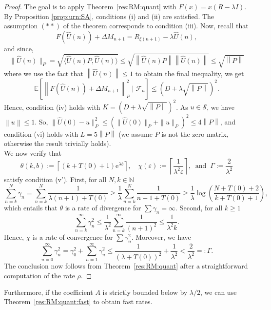 \documentclass[12pt]{amsart}
\theoremstyle{definition}
\theoremstyle{remark}
\newcommand{\norm}[1]{\left\lVert#1\right\rVert}
\newcommand{\NN}{\mathbb{N}}
\newcommand{\EE}{\mathbb{E}}
\newcommand{\eps}{\varepsilon}
\begin{document}
\begin{proof}
   The goal is to apply Theorem~\ref{res:RM:quant} with $F(x)= x(R-\lambda I)$. By Proposition \ref{prop:urn:SA}, conditions (i) and (ii) are satisfied. The assumption $(**)$ of the theorem corresponds to condition (iii).  Now, recall that
   \[
   F(\hat{U}(n))+\Delta M_{n+1}=R_{\xi(n+1)} - \lambda \hat{U}(n),
   \]
   and since,
   \[
   \|\hat{U}(n)\|_P = \sqrt{\langle \hat{U}(n)P, \hat{U}(n)\rangle} \le \sqrt{\norm{\hat{U}(n)P}\norm{\hat{U}(n)}} \le \sqrt{\norm{P}}
   \]
   where we use the fact that $\norm{\hat{U}(n)} \le 1$ to obtain the final inequality, we get
   \[
   \EE\left[ \left\| F(\hat{U}(n))+\Delta M_{n+1} \right\|_P^2 \mid \mathcal{F}_n \right] \leq (D+\lambda\sqrt{\norm{P}})^2.
   \]
   Hence, condition (iv) holds with $K=(D+\lambda\sqrt{\norm{P}})^2$. As $u\in \mathcal{S}$, we have $\norm{u}\le 1$. So, $\|\hat{U}(0)-u\|_P^2\leq \left(\|\hat{U}(0)\|_P+\|u\|_P\right)^2\leq 4 \norm{P}$, and condition (vi) holds with $L=5\norm{P}$ (we assume $P$ is not the zero matrix, otherwise the result trivially holds).\\
   
   We now verify that
   \[
   \theta(k,b):=\left\lceil(k+T(0)+1)\mathrm{e}^{\lambda b}\right\rceil, \quad \chi(\eps):=\left\lceil \frac{1}{\lambda^2\eps}\right\rceil,\ \text{ and }\ \Gamma:=\frac{2}{\lambda^2}
   \]
   satisfy condition (v'). First, for all $N,k\in\NN$
   \begin{equation*}
       \sum_{n=k}^N\gamma_n=\sum_{n=k}^N \frac{1}{\lambda(n+1)+T(0)}\geq \frac{1}{\lambda}\sum_{n=k}^N\frac{1}{n+1+T(0)}\geq \frac{1}{\lambda}\log\left(\frac{N+T(0)+2}{k+T(0)+1}\right),
   \end{equation*}
   which entails that $\theta$ is a rate of divergence for $\sum \gamma_n=\infty$. Second, for all $k\geq 1$
   \begin{equation*}
       \sum_{n=k}^\infty \gamma_n^2 \leq \frac{1}{\lambda^2}\sum_{n=k}^\infty \frac{1}{(n+1)^2}\leq \frac{1}{\lambda^2 k}.
   \end{equation*}
   Hence, $\chi$ is a rate of convergence for $\sum \gamma_n^2$. Moreover, we have
   \[
    \sum_{n=0}^\infty \gamma_n^2= \gamma_0^2 + \sum_{n=1}^\infty \gamma_n^2\leq \frac{1}{(\lambda + T(0))^2} + \frac{1}{\lambda^2} <\frac{2}{\lambda^2}=:\Gamma.
   \]
   The conclusion now follows from Theorem~\ref{res:RM:quant} after a straightforward computation of the rate $\rho$.
\end{proof}
Furthermore, if the coefficient $A$ is strictly bounded below by $\lambda/2$, we can use Theorem~\ref{res:RM:quant:fast} to obtain fast rates.
\end{document}
